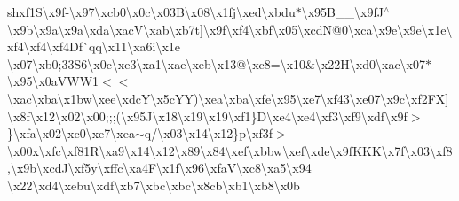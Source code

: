 \begin{DoxyCompactItemize}
sh{}xf1\+S\textbackslash{}x9f-\/\textbackslash{}x97\textbackslash{}xcb0\textbackslash{}x0c\textbackslash{}x03\+B\textbackslash{}x08\textbackslash{}x1fj\textbackslash{}xed\textbackslash{}xbdu$\ast$\textbackslash{}x95\+B\+\_\+\+\_\+\textbackslash{}x9f\+J$^\wedge$\textbackslash{}x9b\textbackslash{}x9a\textbackslash{}x9a\textbackslash{}xda\textbackslash{}xac\+V\textbackslash{}xab\textbackslash{}xb7t\mbox{]}\textbackslash{}x9f\textbackslash{}xf4\textbackslash{}xbf\textbackslash{}x05\textbackslash{}xcd\+N@0\textbackslash{}xca\textbackslash{}x9e\textbackslash{}x9e\textbackslash{}x1e\textbackslash{}xf4\textbackslash{}xf4\textbackslash{}xf4\+Df\`{}qq\textbackslash{}x11\textbackslash{}xa6i\textbackslash{}x1e \textbackslash{}x07\textbackslash{}xb0;33\+S6\textbackslash{}x0c\textbackslash{}xe3\textbackslash{}xa1\textbackslash{}xae\textbackslash{}xeb\textbackslash{}x13@\textbackslash{}xc8=\textbackslash{}x10\&\textbackslash{}x22\+H\textbackslash{}xd0\textbackslash{}xac\textbackslash{}x07$\ast$\textbackslash{}x95\textbackslash{}x0a\+V\+W\+W1$<$$<$\textbackslash{}xac\textbackslash{}xba\textbackslash{}x1bw\textbackslash{}xee\textbackslash{}xdc\+Y\textbackslash{}x5c\+Y\+Y)\textbackslash{}xea\textbackslash{}xba\textbackslash{}xfe\textbackslash{}x95\textbackslash{}xe7\textbackslash{}xf43\textbackslash{}xe07\textbackslash{}x9c\textbackslash{}xf2\+F\+X\mbox{]}\textbackslash{}x8f\textbackslash{}x12\textbackslash{}x02\textbackslash{}x00;;;(\textbackslash{}x95\+J\textbackslash{}x18\textbackslash{}x19\textbackslash{}x19\textbackslash{}xf1\}\+D\textbackslash{}xe4\textbackslash{}xe4\textbackslash{}xf3\textbackslash{}xf9\textbackslash{}xdf\textbackslash{}x9f$>$\}\textbackslash{}xfa\textbackslash{}x02\textbackslash{}xc0\textbackslash{}xe7\textbackslash{}xea$\sim$q/\textbackslash{}x03\textbackslash{}x14\textbackslash{}x12\}p\textbackslash{}xf3f$>$\textbackslash{}x00x\textbackslash{}xfc\textbackslash{}xf81\+R\textbackslash{}xa9\textbackslash{}x14\textbackslash{}x12\textbackslash{}x89\textbackslash{}x84\textbackslash{}xef\textbackslash{}xbbw\textbackslash{}xef\textbackslash{}xde\textbackslash{}x9f\+K\+K\+K\textbackslash{}x7f\textbackslash{}x03\textbackslash{}xf8,\textbackslash{}x9b\textbackslash{}xcd\+J\textbackslash{}xf5y\textbackslash{}xffc\textbackslash{}xa4\+F\textbackslash{}x1f\textbackslash{}x96\textbackslash{}xfa\+V\textbackslash{}xc8\textbackslash{}xa5\textbackslash{}x94 \textbackslash{}x22\textbackslash{}xd4\textbackslash{}xebu\textbackslash{}xdf\textbackslash{}xb7\textbackslash{}xbc\textbackslash{}xbc\textbackslash{}x8cb\textbackslash{}xb1\textbackslash{}xb8\textbackslash{}x0b 
\end{DoxyCompactItemize}
